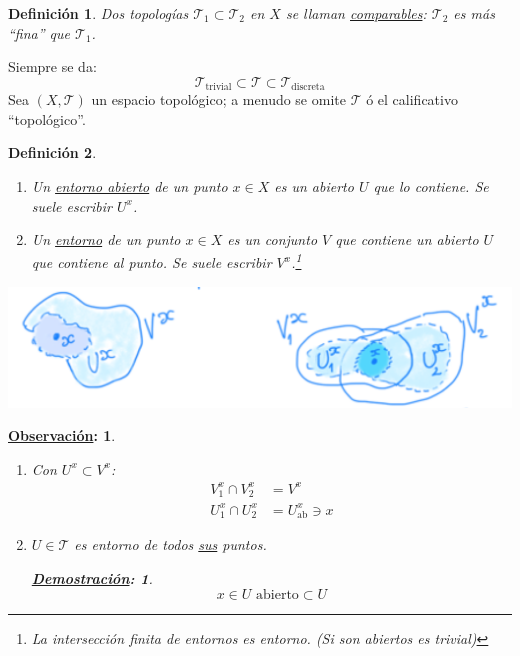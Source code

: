 \documentclass[10pt,a4paper,openright]{book}
\theoremstyle{break}
\newtheorem*{defi}{Definición}
\newtheorem*{demo}{\underline{Demostración}:}
\newtheorem*{obs}{\underline{Observación}:}
\begin{document}
\begin{defi}
Dos topologías $\mathcal{T}_1 \subset \mathcal{T}_2$ en $X$ se llaman \underline{comparables}: $\mathcal{T}_2$ es más ``fina'' que $\mathcal{T}_1$.
\end{defi}
Siempre se da:
\[
\mathcal{T}_{\text{trivial}} \subset \mathcal{T} \subset \mathcal{T}_{\text{discreta}} 
\]
Sea $\left( X, \mathcal{T} \right)$ un espacio topológico; a menudo se omite $\mathcal{T}$ ó el calificativo ``topológico''. 

\begin{defi}
\begin{enumerate}
    \item Un \underline{entorno abierto} de un punto $x \in X$ es un abierto $U$ que lo contiene. Se suele escribir $U^x$.
    \item Un \underline{entorno} de un punto $x \in X$ es un conjunto $V$ que contiene un abierto $U$ que contiene al punto. Se suele escribir $V^x$.\footnote{La intersección finita de entornos es entorno. (Si son abiertos es trivial)}
\end{enumerate}
\end{defi}
\begin{center}
    \includegraphics[scale=0.2]{images/def_entornos} 
\end{center}
\begin{obs}    
\begin{enumerate}
    \item Con $U^x \subset V^x$:
    \begin{align*}
        V_1^x \cap V_2^x &= V^x\\
        U_1^x \cap U_2^x &= U_{\text{ab}}^x \ni x
    \end{align*}

    \item $U \in \mathcal{T}$ es entorno de todos \underline{sus} puntos.
    \begin{demo}
    \[
    x \in U \text{ abierto} \subset U
    \]
    \end{demo}
\end{enumerate}
\end{obs}
\end{document}
